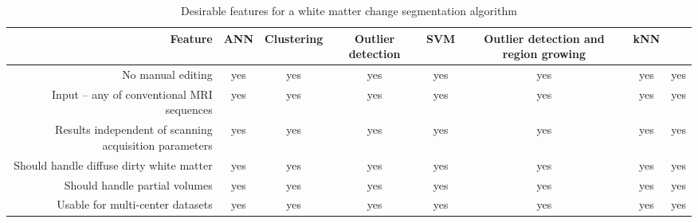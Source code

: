\begin{table}
\centering
    \begin{tabular}  {  r | c c c c c c c }
        Feature & ANN \cite{Zijdenbos_2002} & Clustering \cite{LesionTOADS_2010} & Outlier detection \cite{OutlierLocalIntensity_2011} & SVM \cite{CascadeOrig} & Outlier detection and region growing \cite{LesionSegmentationToolbox_2012} & kNN \cite{kNN-TTPs_2013} & \cite{Rotation-invariant_2015} \\
    \hline %
        No manual editing                                      & yes & yes & yes & yes & yes & yes & yes \\ 
        Input – any of conventional MRI sequences              & yes & yes & yes & yes & yes & yes & yes \\ 
        Results independent of scanning acquisition parameters & yes & yes & yes & yes & yes & yes & yes \\ 
        Should handle diffuse dirty white matter               & yes & yes & yes & yes & yes & yes & yes \\ 
        Should handle partial volumes                          & yes & yes & yes & yes & yes & yes & yes \\ 
        Usable for multi-center datasets                       & yes & yes & yes & yes & yes & yes & yes \\ 
    \hline
    \end{tabular} 
    \caption{Desirable features for a white matter change segmentation algorithm } 
    \label{Table:Other_Methods}
\end{table}
  
  
  
  